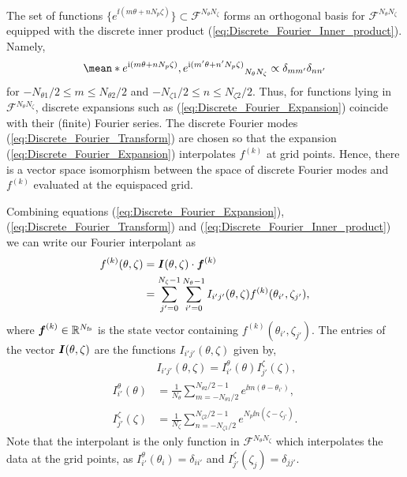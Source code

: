 The set of functions $\{e^{\ii(m\theta + nN_p\zeta)}\}\subset \mathcal{F}^{N_\theta N_\zeta}$ forms an orthogonal basis for $\mathcal{F}^{N_\theta N_\zeta}$ equipped with the discrete inner product (\ref{eq:Discrete_Fourier_Inner_product}). Namely, 
%
\begin{align}
	\mean*{e^{\ii(m\theta + nN_{p}\zeta)},e^{\ii(m'\theta + n'N_{p}\zeta)}}_{N_\theta N_\zeta} 
	\propto
	\delta_{mm'}\delta_{nn'}
\end{align}
for $-N_{\theta 1}/2\le m \le N_{\theta 2}/2$ and $-N_{\zeta 1}/2\le n \le N_{\zeta 2}/2$. Thus, for functions lying in $\mathcal{F}^{N_\theta N_\zeta}$, discrete expansions such as (\ref{eq:Discrete_Fourier_Expansion}) coincide with their (finite) Fourier series. The discrete Fourier modes (\ref{eq:Discrete_Fourier_Transform}) are chosen so that the expansion (\ref{eq:Discrete_Fourier_Expansion}) interpolates $f^{(k)}$ at grid points. Hence, there is a vector space isomorphism between the space of discrete Fourier modes and $f^{(k)}$ evaluated at the equispaced grid. 


Combining equations (\ref{eq:Discrete_Fourier_Expansion}), (\ref{eq:Discrete_Fourier_Transform}) and (\ref{eq:Discrete_Fourier_Inner_product}) we can write our Fourier interpolant as
%
\begin{align}
	f^{(k)}(\theta,\zeta) 
	& = 
	\vb*{I}(\theta,\zeta) \cdot \vb*{f}^{(k)}
	\nonumber
	\\
	& =
	\sum_{j'=0}^{N_{\zeta}-1}
	\sum_{i'=0}^{N_{\theta}-1}
	I_{i'j'}(\theta,\zeta)
	f^{(k)}(\theta_{i'},\zeta_{j'})
	,
	\label{eq:Fourier_interpolant}
\end{align}
where $\vb*{f}^{(k)}\in\mathbb{R}^{N_{\text{fs}}}$ is the state vector containing $f^{(k)}(\theta_{i'},\zeta_{j'})$. The entries of the vector $\vb*{I}(\theta,\zeta)$ are the functions $I_{i'j'}(\theta,\zeta)$ given by, 
\begin{align}
	& I_{i'j'}(\theta,\zeta)
	=
	I_{i'}^\theta(\theta)
	I_{j'}^\zeta(\zeta),
\\
	I_{i'}^{\theta}(\theta) &= 
	\frac{1}{N_\theta}
	\sum_{m=-N_{\theta1}/2}^{N_{\theta2}/2-1}
	e^{{ \ii m (\theta-\theta_{i'})} },
	\\
	I_{j'}^{\zeta}(\zeta) &= 
	\frac{1}{N_\zeta}
	\sum_{n=-N_{\zeta1}/2}^{N_{\zeta2}/2-1}
	e^{{ N_p\ii n (\zeta-\zeta_{j'})} }
	.
\end{align}
Note that the interpolant is the only function in $\mathcal{F}^{N_\theta N_\zeta}$ which interpolates the data at the grid points, as $I_{i'}^\theta(\theta_i)=\delta_{ii'}$ and $I_{j'}^\zeta(\zeta_j)=\delta_{jj'}$. 

